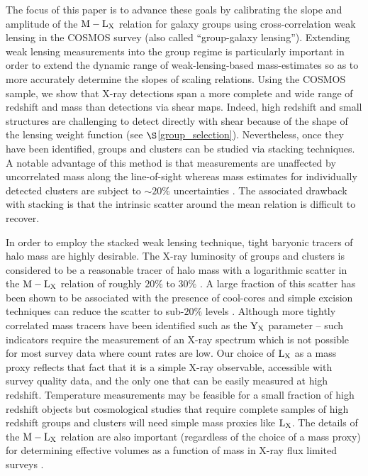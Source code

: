 \documentclass[12pt]{emulateapj}
\newcommand{\mlx}{$\rm{M} - \rm{L}_{\rm X}$ }
\newcommand{\lx}{$\rm{L}_{\rm X}$ }
\newcommand{\eg}{{\it e.g.}}
\begin{document}
The focus of this paper is to advance these goals by calibrating the
slope and amplitude of the \mlx relation for galaxy groups using
cross-correlation weak lensing in the COSMOS survey (also called
``group-galaxy lensing''). Extending weak lensing measurements into
the group regime is particularly important in order to extend the
dynamic range of weak-lensing-based mass-estimates so as to more
accurately determine the slopes of scaling relations. Using the COSMOS
sample, we show that X-ray detections span a more complete and wide
range of redshift and mass than detections via shear maps. Indeed,
high redshift and small structures are challenging to detect directly
with shear because of the shape of the lensing weight function (see
$\S$\ref{group_selection}). Nevertheless, once they have been
identified, groups and clusters can be studied via stacking
techniques. A notable advantage of this method is that measurements
are unaffected by uncorrelated mass along the line-of-sight whereas
mass estimates for individually detected clusters are subject to $\sim
20 \%$ uncertainties
\citep[][]{Metzler:2001,Hoekstra:2003a,de-Putter:2005}. The associated
drawback with stacking is that the intrinsic scatter around the mean
relation is difficult to recover.

In order to employ the stacked weak lensing technique, tight baryonic
tracers of halo mass are highly desirable. The X-ray luminosity of
groups and clusters is considered to be a reasonable tracer of halo
mass with a logarithmic scatter in the \mlx relation of roughly $20\%$
to $30\%$ \citep[][]{Stanek:2006, Maughan:2007, Pratt:2008, Rozo:2008,
  Rykoff:2008, Vikhlinin:2009}. A large fraction of this scatter has
been shown to be associated with the presence of cool-cores and simple
excision techniques can reduce the scatter to sub-$20\%$ levels
\citep[][]{Maughan:2007,Pratt:2008}. Although more tightly correlated
mass tracers have been identified such as the ${\rm Y_{X}}$ parameter
\citep[\eg][]{Kravtsov:2006} -- such indicators require the
measurement of an X-ray spectrum which is not possible for most survey
data where count rates are low. Our choice of \lx as a mass proxy
reflects that fact that it is a simple X-ray observable, accessible
with survey quality data, and the only one that can be easily measured
at high redshift. Temperature measurements may be feasible for a small
fraction of high redshift objects but cosmological studies that
require complete samples of high redshift groups and clusters will
need simple mass proxies like ${\rm{L_{\rm X}}}$. The details of the
\mlx relation are also important (regardless of the choice of a mass
proxy) for determining effective volumes as a function of mass in
X-ray flux limited surveys \citep[][]{Stanek:2006, Vikhlinin:2009}.
\end{document}
